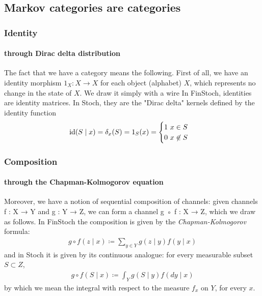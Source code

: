 \subsection{Markov categories are categories}

\begin{frame}
    \frametitle{Identity}
    \framesubtitle{through Dirac delta distribution}
    The fact that we have a category means the following. First of all, we have an identity morphism $1_X: X\to X$ for each object (alphabet) $X$, which represents no change in the state of $X$. We draw it simply with a wire
    In FinStoch, identities are identity matrices. In Stoch, they are the "Dirac delta" kernels defined by the identity function
    \[
        \text{\normalfont id} (S\mid x) = \delta_x (S) = 1_S(x) = \begin{cases} 1\ x\in S\\ 0\ x\not \in S
        \end{cases}
    \]
\end{frame}

\begin{frame}
    \frametitle{Composition}
    \framesubtitle{through the Chapman-Kolmogorov equation}
    Moreover, we have a notion of sequential composition of channels: given channels f : X → Y and g : Y → Z, we can form a channel g ◦ f : X → Z, which we draw as follows.
    In FinStoch the composition is given by the \emph{Chapman-Kolmogorov} formula:
    \begin{align}
        g\circ f (z\mid x) \coloneqq \sum_{y\in Y} g(z\mid y) f(y\mid x)
    \end{align}
    and in Stoch it is given by its continuous analogue: for every measurable subset $S\subset Z$,
    \begin{align}
        g\circ f (S\mid x) \coloneqq \int_Y g(S\mid y) f(dy\mid x)
    \end{align}
    by which we mean the integral with respect to the measure $f_x$ on $Y$, for every $x$.
\end{frame}

